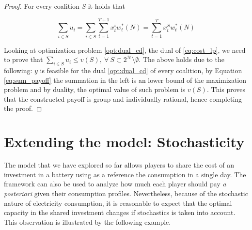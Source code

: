 \begin{proof}
For every coalition $S$ it holds that 

\begin{equation}\label{eq:sum_payoff}
\sum_{i\in S}u_i = \sum_{i \in S}\sum_{t=1}^{T+1} x^i_tw^*_t(N) = \sum_{t=1}^{T} x^S_t w^*_t(N)
\end{equation}

Looking at optimization problem \eqref{opt:dual_cd}, the dual of \eqref{eq:cost_lp}, we need to prove that $\sum_{i \in S} u_i \leq v(S), \ \forall \ S \subset 2^\mathcal{N} \setminus \emptyset$. The above holds due to the following: $y$ is feasible for the dual \eqref{opt:dual_cd} of every coalition, by Equation \eqref{eq:sum_payoff}  the summation in the left is an lower bound of the maximization problem and by duality, the optimal value of such problem is $v(S)$. 
This proves that the constructed payoff is group and individually rational, hence completing the proof. 
\end{proof}

\section{Extending the model: Stochasticity}\label{sec:stoc}

The model that we have explored so far allows players to share the cost of an investment in a battery using as a reference the consumption in a single day. The framework can also be used to analyze how much each player should pay \textit{a posteriori} given their consumption profiles. Nevertheless, because of the stochastic nature of electricity consumption, it is reasonable to expect that the optimal capacity in the shared investment changes if stochastics is taken into account. This observation is illustrated by the following example.

